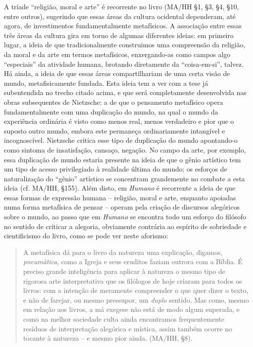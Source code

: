 \documentclass[
	12pt,				%
	openright,			%
	oneside,			%
	a4paper,			%
	english,			%
	french,				%
	spanish,			%
	brazil				%
	]{abntex2}
\begin{document}
A tríade “religião, moral e arte” é recorrente no livro (MA/HH §1, §3, §4, §10, entre outros), sugerindo que essas áreas da cultura ocidental dependeram, até agora, de investimentos fundamentalmente metafísicos. A associação entre essas três áreas da cultura gira em torno de algumas diferentes ideias: em primeiro lugar, a ideia de que tradicionalmente construimos uma compreensão da religião, da moral e da arte em termos metafísicos, enxergando-as como campos algo “especiais” da atividade humana, brotando diretamente da “coisa-em-si”, talvez. Há ainda, a ideia de que essas áreas compartilhariam de uma certa visão de mundo, metafisicamente fundada. Esta ideia tem a ver com a tese já subentendida no trecho citado acima, e que será completamente desenvolvida nas obras subsequentes de Nietzsche: a de que o pensamento metafísico opera fundamentalmente com uma duplicação do mundo, na qual o mundo da experiência ordinária é visto como menos real, menos verdadeiro e pior que o suposto outro mundo, embora este permaneça ordinariamente intangível e incognoscível. Nietzsche critica esse tipo de duplicação do mundo apontando-o como sintoma de insatisfação, cansaço, negação. No campo da arte, por exemplo, essa duplicação de mundo estaria presente na ideia de que o gênio artístico tem um tipo de acesso privilegiado à realidade última do mundo; os esforços de naturalização do “gênio” artístico se concentram grandemente no combate a esta ideia (cf. MA/HH, §155). Além disto, em \textit{Humano} é recorrente a ideia de que essas formas de expressão humana – religião, moral e arte, enquanto apoiadas numa forma metafísica de pensar – operam pela criação de discursos alegóricos sobre o mundo, ao passo que em \textit{Humano} se encontra todo um esforço do filósofo no sentido de criticar a alegoria, obviamente contrária ao espírito de sobriedade e cientificismo do livro, como se pode ver neste aforismo:

\begin{quotation}
A metafísica dá para o livro da natureza uma explicação, digamos, \textit{pneumática}, como a Igreja e seus eruditos faziam outrora com a Bíblia. É preciso grande inteligência para aplicar à natureza o mesmo tipo de rigorosa arte interpretativa que os filólogos de hoje criaram para todos os livros: com a intenção de meramente compreender o que quer dizer o texto, e não de farejar, ou mesmo pressupor, um \textit{duplo} sentido. Mas como, mesmo em relação aos livros, a má exegese não está de modo algum superada, e como na melhor sociedade culta ainda encontramos frequentemente resíduos de interpretação alegórica e mística, assim também ocorre no tocante à natureza – e mesmo pior ainda. (MA/HH, §8).
\end{quotation}
\end{document}
